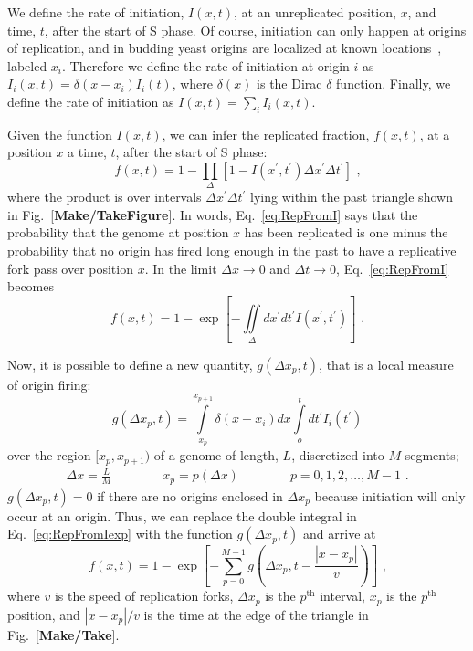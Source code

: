 		We define the rate of initiation, $I(x,t)$, at an unreplicated position, $x$, and time, $t$, after the start of S phase.
		Of course, initiation can only happen at origins of replication, and in budding yeast origins are localized at known locations~\cite{OriDB}, labeled $x_i$.
		Therefore we define the rate of initiation at origin $i$ as $I_i(x,t)=\delta(x-x_i)I_i(t)$, where $\delta(x)$ is the Dirac $\delta$ function.
		Finally, we define the rate of initiation as $I(x,t) = \sum\limits_i I_i(x,t)$.
		
		Given the function $I(x,t)$, we can infer the replicated fraction, $f(x,t)$, at a position $x$ a time, $t$, after the start of S phase:
		\begin{equation} \label{eq:RepFromI}
			f\left( x,t\right) = 1 - \prod_\Delta\left[1-I\left( x^\prime,t^\prime\right)\Delta x^\prime\Delta t^\prime\right] \text{ ,}
		\end{equation}
		where the product is over intervals $\Delta x^\prime \Delta t^\prime$ lying within the past triangle shown in Fig.~[\textbf{Make/TakeFigure}].
		In words, Eq.~\ref{eq:RepFromI} says that the probability that the genome at position $x$ has been replicated is one minus the probability that no origin has fired long enough in the past to have a replicative fork pass over position $x$.
		In the limit $\Delta x\rightarrow0$ and $\Delta t\rightarrow0$, Eq.~\ref{eq:RepFromI} becomes
		\begin{equation} \label{eq:RepFromIexp}
			f\left( x,t\right) = 1 - \exp\left[-\iint\limits_\Delta dx^\prime dt^\prime I\left( x^\prime,t^\prime\right)\right] \text{ .}
		\end{equation}
		
		Now, it is possible to define a new quantity, $g(\Delta x_p,t)$, that is a local measure of origin firing:
		\begin{equation} \label{eq:LocalOriginFiring}
			g\left(\Delta x_p,t\right) = \int\limits_{x_p}^{x_{p+1}}\delta\left( x-x_i\right) dx \int\limits_o^t dt^\prime I_i\left( t^\prime\right)
		\end{equation}
		over the region $[x_p, x_{p+1})$ of a genome of length, $L$, discretized into $M$ segments;
		\begin{align}
			\Delta x = \frac{L}{M} \qquad\qquad x_p = p\left(\Delta x\right) \qquad\qquad p = 0, 1, 2, \ldots , M-1 \text{ .}
		\end{align}
		$g(\Delta x_p,t)=0$ if there are no origins enclosed in $\Delta x_p$ because initiation will only occur at an origin.
		Thus, we can replace the double integral in Eq.~\ref{eq:RepFromIexp} with the function $g(\Delta x_p,t)$ and arrive at
		\begin{equation} \label{eq:RepFromG}
			f\left( x,t\right) = 1 - \exp\left[ - \sum\limits_{p=0}^{M-1}g\left(\Delta x_p,t-\frac{\left| x-x_p \right|}{v}\right)\right] \text{ ,}
		\end{equation}
		where $v$ is the speed of replication forks, $\Delta x_p$ is the $p^\text{th}$ interval, $x_p$ is the $p^\text{th}$ position, and $\left| x-x_p \right|/v$ is the time at the edge of the triangle in Fig.~[\textbf{Make/Take}].
		
